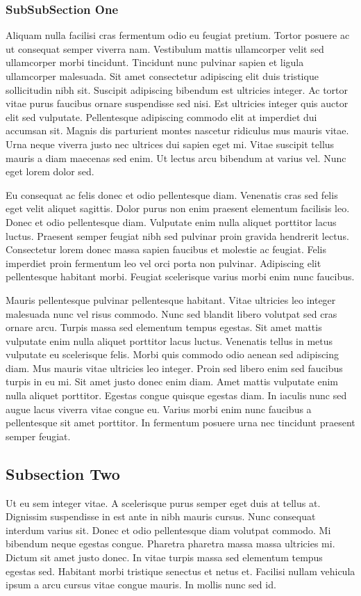 \documentclass{ledger}
\begin{document}
\subsubsection{SubSubSection One}Aliquam nulla facilisi cras fermentum odio eu feugiat pretium. Tortor posuere ac ut consequat semper viverra nam. Vestibulum mattis ullamcorper velit sed ullamcorper morbi tincidunt. Tincidunt nunc pulvinar sapien et ligula ullamcorper malesuada.\cite{WhitePaper} Sit amet consectetur adipiscing elit duis tristique sollicitudin nibh sit. Suscipit adipiscing bibendum est ultricies integer. Ac tortor vitae purus faucibus ornare suspendisse sed nisi. Est ultricies integer quis auctor elit sed vulputate. Pellentesque adipiscing commodo elit at imperdiet dui accumsan sit. Magnis dis parturient montes nascetur ridiculus mus mauris vitae. Urna neque viverra justo nec ultrices dui sapien eget mi. Vitae suscipit tellus mauris a diam maecenas sed enim. Ut lectus arcu bibendum at varius vel. Nunc eget lorem dolor sed.\cite{note1}

Eu consequat ac felis donec et odio pellentesque diam. Venenatis cras sed felis eget velit aliquet sagittis. Dolor purus non enim praesent elementum facilisis leo. Donec et odio pellentesque diam. Vulputate enim nulla aliquet porttitor lacus luctus.\cite{Booker} Praesent semper feugiat nibh sed pulvinar proin gravida hendrerit lectus. Consectetur lorem donec massa sapien faucibus et molestie ac feugiat. Felis imperdiet proin fermentum leo vel orci porta non pulvinar. Adipiscing elit pellentesque habitant morbi. Feugiat scelerisque varius morbi enim nunc faucibus.

Mauris pellentesque pulvinar pellentesque habitant. Vitae ultricies leo integer malesuada nunc vel risus commodo. Nunc sed blandit libero volutpat sed cras ornare arcu. Turpis massa sed elementum tempus egestas. Sit amet mattis vulputate enim nulla aliquet porttitor lacus luctus. Venenatis tellus in metus vulputate eu scelerisque felis. Morbi quis commodo odio aenean sed adipiscing diam. Mus mauris vitae ultricies leo integer. Proin sed libero enim sed faucibus turpis in eu mi. Sit amet justo donec enim diam. Amet mattis vulputate enim nulla aliquet porttitor. Egestas congue quisque egestas diam. In iaculis nunc sed augue lacus viverra vitae congue eu. Varius morbi enim nunc faucibus a pellentesque sit amet porttitor. In fermentum posuere urna nec tincidunt praesent semper feugiat.

\subsection {Subsection Two}
Ut eu sem integer vitae. A scelerisque purus semper eget duis at tellus at. Dignissim suspendisse in est ante in nibh mauris cursus. Nunc consequat interdum varius sit. Donec et odio pellentesque diam volutpat commodo. Mi bibendum neque egestas congue. Pharetra pharetra massa massa ultricies mi. Dictum sit amet justo donec. In vitae turpis massa sed elementum tempus egestas sed. Habitant morbi tristique senectus et netus et. Facilisi nullam vehicula ipsum a arcu cursus vitae congue mauris. In mollis nunc sed id.
\end{document}
